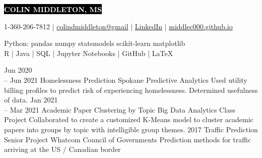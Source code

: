 \documentclass[11pt]{developercv} %
\begin{document}
\setlength{\abovedisplayskip}{0pt}
\setlength{\belowdisplayskip}{0pt}

\colorbox{black}{{\HUGE\textcolor{white}{\textbf{\MakeUppercase{Colin Middleton, MS}}}}}

\vspace{6pt}

\begin{center}
	1-360-206-7812
	\hspace{0.25cm} | \hspace{0.25cm}
	\href{mailto:colindmiddleton@gmail.com}{colindmiddleton@gmail}
	\hspace{0.25cm} | \hspace{0.25cm}
	\href{https://www.linkedin.com/in/colin-middleton-000/}{LinkedIn}
	\hspace{0.25cm} | \hspace{0.25cm}
	\href{https://middlec000.github.io/}{middlec000.github.io}
\end{center}

\vspace{0.25cm}


\begin{center}
	Python: \quad pandas \quad numpy \quad statsmodels \quad scikit-learn \quad matplotlib 
	\\
	\vspace{0.25cm}
	R \quad | \quad Java \quad | \quad SQL \quad | \quad
	Jupyter Notebooks \quad | \quad GitHub \quad | \quad LaTeX
\end{center}



\begin{entrylist}
	\entry
	    {Jun 2020 \\
		-- Jun 2021}
	    {Homelessness Prediction}
	    {Spokane Predictive Analytics}
	    {Used utility billing profiles to predict risk of experiencing homelessness. Determined usefulness of data.}
	\entry
		{Jan 2021 \\
		-- Mar 2021}
		{Academic Paper Clustering by Topic}
		{Big Data Analytics Class Project}
		{Collaborated to create a customized K-Means model to cluster academic papers into groups by topic with intelligible group themes.}
	\entry
		{2017}
		{Traffic Prediction Senior Project}
		{Whatcom Council of Governments}
		{Prediction methods for traffic arriving at the US / Canadian border}
\end{entrylist}
\end{document}
